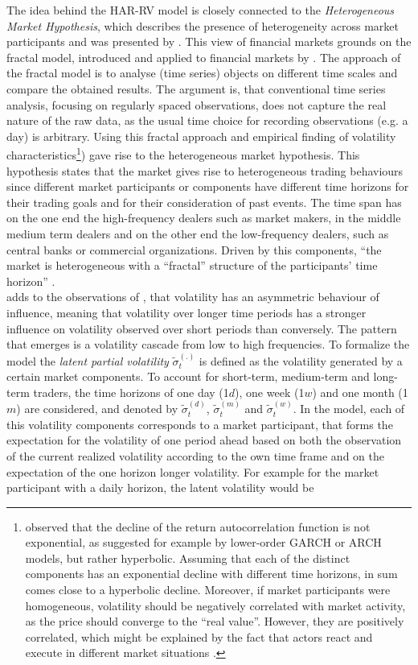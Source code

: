 The idea behind the HAR-RV model is closely connected to the \emph{Heterogeneous Market Hypothesis}, which describes the presence of heterogeneity across market participants and was presented by \textcite{mueller1993}. This view of financial markets grounds on the fractal model, introduced and applied to financial markets by \textcite{mandelbrot1963}. The approach of the fractal model is to analyse (time series) objects on different time scales and compare the obtained results. The argument is, that conventional time series analysis, focusing on regularly spaced observations, does not capture the real nature of the raw data, as the usual time choice for recording observations (e.g. a day) is arbitrary. Using this fractal approach and empirical finding of volatility characteristics\footnote{\textcite{mueller1993} observed that the decline of the return autocorrelation function is not exponential, as suggested for example by lower-order GARCH or ARCH models, but rather hyperbolic. Assuming that each of the distinct components has an exponential decline with different time horizons, in sum comes close to a hyperbolic decline. Moreover, if market participants were homogeneous, volatility should be negatively correlated with market activity, as the price should converge to the ``real value''. However, they are positively correlated, which might be explained by the fact that actors react and execute in different market situations \parencite{mueller1993}.}) gave rise to the heterogeneous market hypothesis. This hypothesis states that the market gives rise to heterogeneous trading behaviours since different market participants or components have different time horizons for their trading goals and for their consideration of past events. The time span has on the one end the high-frequency dealers such as market makers, in the middle medium term dealers and on the other end the low-frequency dealers, such as central banks or commercial organizations. Driven by this components, ``the market is heterogeneous with a ``fractal'' structure of the participants' time horizon'' \parencite[p.12]{mueller1993}.\\
\textcite{corsi2009} adds to the observations of \textcite{mueller1993}, that volatility has an asymmetric behaviour of influence, meaning that volatility over longer time periods has a stronger influence on volatility observed over short periods than conversely. The pattern that emerges is a volatility cascade from low to high frequencies. To formalize the model the \emph{latent partial volatility} $\tilde{\sigma}_{t}^{(.)}$ is defined as the volatility generated by a certain market components. To account for short-term, medium-term and long-term traders, the time horizons of one day (1$d$), one week (1$w$) and one month (1$m$) are considered, and denoted by $\tilde{\sigma}_{t}^{(d)}$, $\tilde{\sigma}_{t}^{(m)}$ and $\tilde{\sigma}_{t}^{(w)}$. In the model, each of this volatility components corresponds to a market participant, that forms the expectation for the volatility of one period ahead based on both the observation of the current realized volatility according to the own time frame and on the expectation of the one horizon longer volatility. For example for the market participant with a daily horizon, the latent volatility would be
